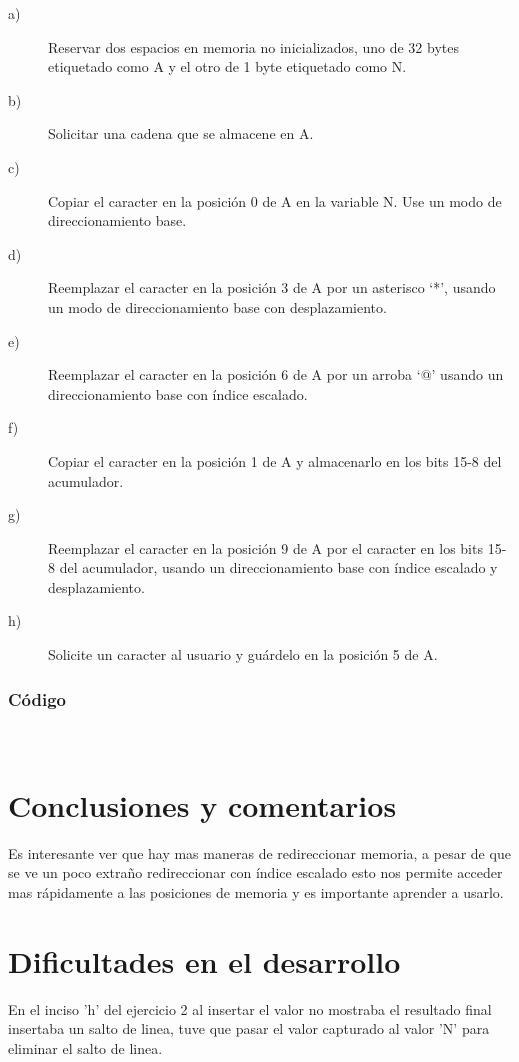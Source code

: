 \documentclass[12pt]{article}
\begin{document}
\begin{description}
\item[{a)}] Reservar dos espacios en memoria no inicializados, uno de 32 bytes etiquetado como A y el otro de 1 byte etiquetado como N.

\item[{b)}] Solicitar una cadena que se almacene en A.

\item[{c)}] Copiar el caracter en la posición 0 de A en la variable N. Use un modo de direccionamiento base.

\item[{d)}] Reemplazar el caracter en la posición 3 de A por un asterisco ‘*’, usando un modo de direccionamiento base con desplazamiento.

\item[{e)}] Reemplazar el caracter en la posición 6 de A por un arroba ‘@’ usando un direccionamiento base con índice escalado.

\item[{f)}] Copiar el caracter en la posición 1 de A y almacenarlo en los bits 15-8 del acumulador.

\item[{g)}] Reemplazar el caracter en la posición 9 de A por el caracter en los bits 15-8 del acumulador, usando un direccionamiento base con índice escalado y desplazamiento.

\item[{h)}] Solicite un caracter al usuario y guárdelo en la posición 5 de A.
\end{description}


\subsubsection*{Código}
\label{sec:org8171aa6}
\\ 

\section*{Conclusiones y comentarios}
\label{sec:org26458d7}
\begin{mdframed}
Es interesante ver que hay mas maneras de redireccionar memoria, a pesar de que se ve un poco extraño redireccionar con índice escalado esto nos permite acceder mas rápidamente a las posiciones de memoria y es importante aprender a usarlo.
\end{mdframed}

\section*{Dificultades en el desarrollo}
\label{sec:org4f36b2f}
\begin{mdframed}
En el inciso 'h' del ejercicio 2 al insertar el valor no mostraba el resultado final insertaba un salto de linea, tuve que pasar el valor capturado al valor 'N' para eliminar el salto de linea.
\end{mdframed}
\end{document}
